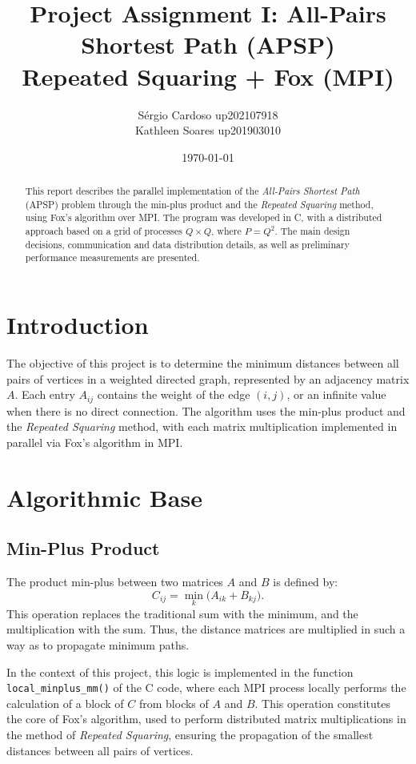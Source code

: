 \documentclass[10pt,a4paper]{article}
\title{Project Assignment I: All-Pairs Shortest Path (APSP)\\
\large Repeated Squaring + Fox (MPI)}
\author{Sérgio Cardoso up202107918 \\ Kathleen Soares up201903010}
\date{\today}
\begin{document}
\maketitle

\begin{abstract}
This report describes the parallel implementation of the \emph{All-Pairs Shortest Path} (APSP) problem through the min-plus product and the \emph{Repeated Squaring} method, using Fox's algorithm over MPI. The program was developed in C, with a distributed approach based on a grid of processes \(Q \times Q\), where \(P = Q^2\). The main design decisions, communication and data distribution details, as well as preliminary performance measurements are presented.
\end{abstract}

\section{Introduction}
The objective of this project is to determine the minimum distances between all pairs of vertices in a weighted directed graph, represented by an adjacency matrix \(A\). Each entry \(A_{ij}\) contains the weight of the edge \((i,j)\), or an infinite value when there is no direct connection. The algorithm uses the min-plus product and the \emph{Repeated Squaring} method, with each matrix multiplication implemented in parallel via Fox's algorithm in MPI.

\section{Algorithmic Base}

\subsection{Min-Plus Product}
The product min-plus between two matrices \(A\) and \(B\) is defined by:
\begin{equation}
C_{ij} = \min_k \bigl(A_{ik} + B_{kj}\bigr).
\end{equation}
This operation replaces the traditional sum with the minimum, and the multiplication with the sum. Thus, the distance matrices are multiplied in such a way as to propagate minimum paths.

In the context of this project, this logic is implemented in the function
\texttt{local\_minplus\_mm()} of the C code, where each MPI process
locally performs the calculation of a block of \( C \) from blocks of
\( A \) and \( B \). This operation constitutes the core of Fox's algorithm,
used to perform distributed matrix multiplications in the method of
\emph{Repeated Squaring}, ensuring the propagation of the smallest distances between
all pairs of vertices.
\end{document}
